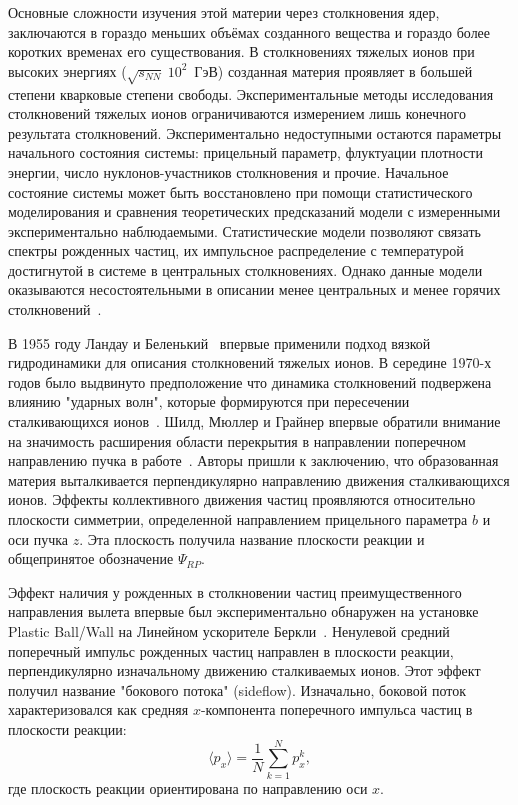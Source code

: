 Основные сложности изучения этой материи через столкновения ядер, заключаются в гораздо меньших объёмах созданного вещества и гораздо более коротких временах его существования. 
В столкновениях тяжелых ионов при высоких энергиях ($\sqrt{s_{NN}}~10^2$~ГэВ) созданная материя проявляет в большей степени кварковые степени свободы.
Экспериментальные методы исследования столкновений тяжелых ионов ограничиваются измерением лишь конечного результата столкновений.
Экспериментально недоступными остаются параметры начального состояния системы: прицельный параметр, флуктуации плотности энергии, число нуклонов-участников столкновения и прочие.
Начальное состояние системы может быть восстановлено при помощи статистического моделирования и сравнения теоретических предсказаний модели с измеренными экспериментально наблюдаемыми.
Статистические модели позволяют связать спектры рожденных частиц, их импульсное распределение с температурой достигнутой в системе в центральных столкновениях.
Однако данные модели оказываются несостоятельными в описании менее центральных и менее горячих столкновений~\cite{NA49:2004iqm, UA5:1981lmw}.

В 1955 году Ландау и Беленький~\cite{Belenkij:1955pgn} впервые применили подход вязкой гидродинамики для описания столкновений тяжелых ионов. 
В середине 1970-х годов было выдвинуто предположение что динамика столкновений подвержена влиянию "ударных волн", которые формируются при пересечении сталкивающихся ионов~\cite{Chapline:1973kkq}.
Шилд, Мюллер и Грайнер впервые обратили внимание на значимость расширения области перекрытия в направлении поперечном направлению пучка в работе~\cite{Scheid:1974zz}.
Авторы пришли к заключению, что образованная материя выталкивается перпендикулярно направлению движения сталкивающихся ионов. 
Эффекты коллективного движения частиц проявляются относительно плоскости симметрии, определенной направлением прицельного параметра $b$ и оси пучка $z$.
Эта плоскость получила название плоскости реакции и общепринятое обозначение $\Psi_{RP}$.

Эффект наличия у рожденных в столкновении частиц преимущественного направления вылета впервые был экспериментально обнаружен на установке Plastic Ball/Wall на Линейном ускорителе Беркли~\cite{Gustafsson:1984ka}. 
Ненулевой средний поперечный импульс рожденных частиц направлен в плоскости реакции, перпендикулярно изначальному движению сталкиваемых ионов.
Этот эффект получил название "бокового потока" (sideflow).
Изначально, боковой поток характеризовался как средняя $x$-компонента поперечного импульса частиц в плоскости реакции:
\begin{equation}
    \langle p_x \rangle = \frac{1}{N}{\sum_{k=1}^N p_x^k},
\end{equation}
где плоскость реакции ориентирована по направлению оси $x$.

